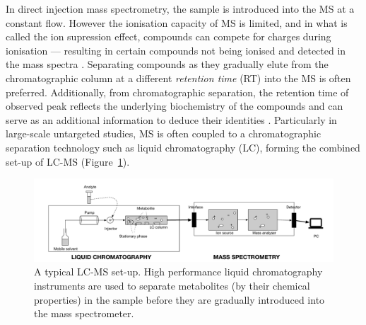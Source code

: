 In direct injection mass spectrometry, the sample is introduced into the MS at a constant flow. However the ionisation capacity of MS is limited, and in what is called the ion supression effect, compounds can compete for charges during ionisation --- resulting in certain compounds not being ionised and detected in the mass spectra \cite{Smith2014}. Separating compounds as they gradually elute from the chromatographic column at a different \emph{retention time} (RT) into the MS is often preferred. Additionally, from chromatographic separation, the retention time of observed peak reflects the underlying biochemistry of the compounds and can serve as an additional information to deduce their identities \cite{Cao2015}. Particularly in large-scale untargeted studies, MS is often coupled to a chromatographic separation technology such as liquid chromatography (LC), forming the combined set-up of LC-MS (Figure~\ref{fig:LC-MS-setup}). 

\begin{figure}
\noindent \begin{centering}
\includegraphics[width=1.0\textwidth]{02-background/figures/LCMS}
\par\end{centering}
\caption[A typical LC-MS set-up.]{\label{fig:LC-MS-setup}A typical LC-MS set-up. High performance liquid chromatography instruments are used to separate metabolites (by their chemical properties) in the sample before they are gradually introduced into the mass spectrometer.}
\end{figure}

